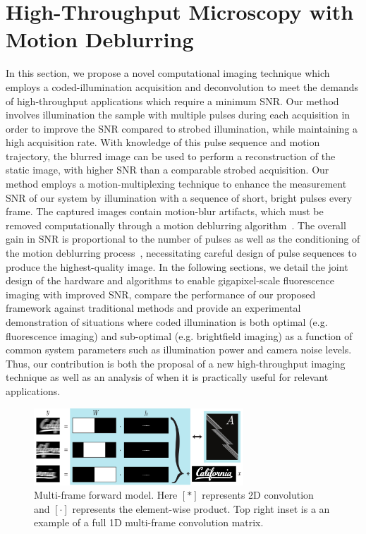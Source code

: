 \section{High-Throughput Microscopy with Motion Deblurring}
In this section, we propose a novel computational imaging technique which employs a coded-illumination acquisition and deconvolution to meet the demands of high-throughput applications which require a minimum SNR. Our method involves illumination the sample with multiple pulses during each acquisition in order to improve the SNR compared to strobed illumination, while maintaining a high acquisition rate. With knowledge of this pulse sequence and motion trajectory, the blurred image can be used to perform a reconstruction of the static image, with higher SNR than a comparable strobed acquisition. Our method employs a motion-multiplexing technique to enhance the measurement SNR of our system by illumination with a sequence of short, bright pulses every frame. The captured images contain motion-blur artifacts, which must be removed computationally through a motion deblurring algorithm~\cite{raskar2006coded}. The overall gain in SNR is proportional to the number of pulses as well as the conditioning of the motion deblurring process~\cite{agrawal2009optimal}, necessitating careful design of pulse sequences to produce the highest-quality image. In the following sections, we detail the joint design of the hardware and algorithms to enable gigapixel-scale fluorescence imaging with improved SNR,
compare the performance of our proposed framework against traditional methods and provide an experimental demonstration of situations where coded illumination is both optimal (e.g. fluorescence imaging) and sub-optimal (e.g. brightfield imaging) as a function of common system parameters such as illumination power and camera noise levels. Thus, our contribution is both the proposal of a new high-throughput imaging technique as well as an analysis of when it is practically useful for relevant applications.

\begin{figure}
  \centering
    \includegraphics[width=0.7\textwidth]{figures/fig_highthroughput_forward_model.pdf}
  \caption{\label{fig:forward_model}Multi-frame forward model. Here $[*]$ represents 2D convolution and $[\cdot]$ represents the element-wise product. Top right inset is a an example of a full 1D multi-frame convolution matrix.}
\end{figure}

